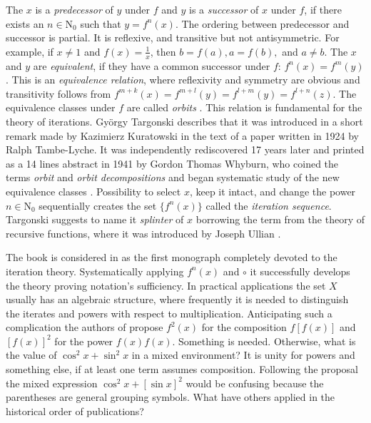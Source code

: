 \documentclass{article}
\begin{document}
The $x$ is a \textit{predecessor} of $y$ under $f$ and $y$ is a \textit{successor} of $x$ under $f$, if there exists an $n \in \mathrm{N}_0$ such that $y = f^n(x)$. The ordering between predecessor and successor is partial. It is reflexive, and transitive but not antisymmetric. For example, if $x \neq 1$ and $f(x) = \frac{1}{x}$, then $b = f(a), a = f(b),$ and $a \neq b$. The $x$ and $y$ are \textit{equivalent}, if they have a common successor under $f$: $f^n(x) = f^m(y)$. This is an \textit{equivalence relation}, where reflexivity and symmetry are obvious and transitivity follows from $f^{m + k}(x) = f^{m + l}(y) = f^{l + m}(y) = f^{l + n}(z)$. The equivalence classes under $f$ are called \textit{orbits} \cite[pp. 13 - 18]{targonski}. This relation is fundamental for the theory of iterations. Gy\"{o}rgy Targonski \cite[p. 14, p. 283]{targonski} describes that it was introduced in a short remark made by Kazimierz Kuratowski in the text of a paper written in 1924 by Ralph Tambe-Lyche. It was independently rediscovered 17 years later and printed as a 14 lines abstract in 1941 by Gordon Thomas Whyburn, who coined the terms \textit{orbit} and \textit{orbit decompositions} and began systematic study of the new equivalence classes \cite[p. 14]{kuczma}. Possibility to select $x$, keep it intact, and change the power $n \in \mathrm{N}_0$ sequentially creates the set $\{f^n(x)\}$ called the \textit{iteration sequence}. Targonski \cite{targonski} suggests to name it \textit{splinter} of $x$ borrowing the term from the theory of recursive functions, where it was introduced by Joseph Ullian \cite{ullian}.

The book \cite{targonski} is considered in \cite[p. 14]{kuczma} as the first monograph completely devoted to the iteration theory. Systematically applying $f^n(x)$ and $\circ$ it successfully develops the theory proving notation's sufficiency. In practical applications the set $X$ usually has an algebraic structure, where frequently it is needed to distinguish the iterates and powers with respect to multiplication. Anticipating such a complication the authors of \cite{kuczma} propose $f^{2}(x)$ for the composition $f[f(x)]$ and $[f(x)]^2$ for the power $f(x)f(x)$. Something is needed. Otherwise, what is the value of $\cos^2{x} + \sin^2{x}$ in a mixed environment? It is unity for powers and something else, if at least one term assumes composition. Following the proposal the mixed expression $\cos^2{x} + [\sin{x}]^2$ would be confusing because the parentheses are general grouping symbols. What have others applied in the historical order of publications?
\end{document}
